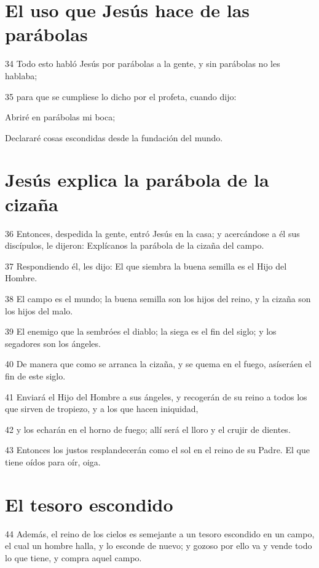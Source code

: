 \section*{El uso que Jesús hace de las parábolas}

\par 34 Todo esto habló Jesús por parábolas a la gente, y sin parábolas no les hablaba;
\par 35 para que se cumpliese lo dicho por el profeta, cuando dijo:
\par Abriré en parábolas mi boca;
\par Declararé cosas escondidas desde la fundación del mundo.

\section*{Jesús explica la parábola de la cizaña}

\par 36 Entonces, despedida la gente, entró Jesús en la casa; y acercándose a él sus discípulos, le dijeron: Explícanos la parábola de la cizaña del campo.
\par 37 Respondiendo él, les dijo: El que siembra la buena semilla es el Hijo del Hombre.
\par 38 El campo es el mundo; la buena semilla son los hijos del reino, y la cizaña son los hijos del malo.
\par 39 El enemigo que la sembróes el diablo; la siega es el fin del siglo; y los segadores son los ángeles.
\par 40 De manera que como se arranca la cizaña, y se quema en el fuego, asíseráen el fin de este siglo.
\par 41 Enviará el Hijo del Hombre a sus ángeles, y recogerán de su reino a todos los que sirven de tropiezo, y a los que hacen iniquidad,
\par 42 y los echarán en el horno de fuego; allí será el lloro y el crujir de dientes.
\par 43 Entonces los justos resplandecerán como el sol en el reino de su Padre. El que tiene oídos para oír, oiga.

\section*{El tesoro escondido}

\par 44 Además, el reino de los cielos es semejante a un tesoro escondido en un campo, el cual un hombre halla, y lo esconde de nuevo; y gozoso por ello va y vende todo lo que tiene, y compra aquel campo.


